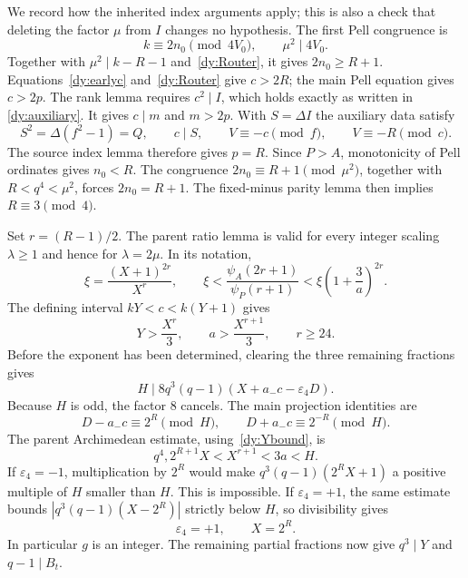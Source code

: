 We record how the inherited index arguments apply; this is also a check
that deleting the factor $\mu$ from $I$ changes no hypothesis.
The first Pell congruence is
\[
 k\equiv2n_0\pmod{4V_0},\qquad \mu^2\mid4V_0.
\]
Together with $\mu^2\mid k-R-1$ and~\eqref{dy:Router}, it gives
$2n_0\ge R+1$.  Equations~\eqref{dy:earlyc} and~\eqref{dy:Router}
give $c>2R$; the main Pell equation gives $c>2p$.
The rank lemma requires $c^2\mid I$, which holds exactly as written in
\eqref{dy:auxiliary}.  It gives $c\mid m$ and $m>2p$.
With $S=\Delta I$ the auxiliary data satisfy
\[
 S^2=\Delta(f^2-1)=Q,\qquad c\mid S,\qquad
 V\equiv-c\pmod f,\qquad V\equiv-R\pmod c.
\]
The source index lemma therefore gives $p=R$.
Since $P>A$, monotonicity of Pell ordinates gives $n_0<R$.
The congruence $2n_0\equiv R+1\pmod{\mu^2}$, together with
$R<q^4<\mu^2$, forces $2n_0=R+1$.  The fixed-minus parity lemma then
implies $R\equiv3\pmod4$.

Set $r=(R-1)/2$.  The parent ratio lemma is valid for every integer
scaling $\lambda\ge1$ and hence for $\lambda=2\mu$.  In its notation,
\begin{equation}
 \xi=\frac{(X+1)^{2r}}{X^r},\qquad
 \xi<\frac{\psi_A(2r+1)}{\psi_P(r+1)}
       <\xi\left(1+\frac3a\right)^{2r}.
 \label{dy:ratio}
\end{equation}
The defining interval $kY<c<k(Y+1)$ gives
\begin{equation}
 Y>\frac{X^r}{3},\qquad a>\frac{X^{r+1}}3,\qquad r\ge24.
 \label{dy:Ybound}
\end{equation}
Before the exponent has been determined, clearing the three remaining
fractions gives
\[
 H\mid8q^3(q-1)(X+a_-c-\varepsilon_4D).
\]
Because $H$ is odd, the factor $8$ cancels.  The main projection identities
are
\[
 D-a_-c\equiv2^R\pmod H,\qquad
 D+a_-c\equiv2^{-R}\pmod H.
\]
The parent Archimedean estimate, using~\eqref{dy:Ybound}, is
\begin{equation}
 q^4,2^{R+1}X<X^{r+1}<3a<H.
 \label{dy:archimedean}
\end{equation}
If $\varepsilon_4=-1$, multiplication by $2^R$ would make
$q^3(q-1)(2^RX+1)$ a positive multiple of $H$ smaller than $H$.
This is impossible.  If $\varepsilon_4=+1$, the same estimate bounds
$|q^3(q-1)(X-2^R)|$ strictly below $H$, so divisibility gives
\begin{equation}
 \varepsilon_4=+1,\qquad X=2^R.
 \label{dy:exponent}
\end{equation}
In particular $g$ is an integer.  The remaining partial fractions now give
$q^3\mid Y$ and $q-1\mid B_t$.

